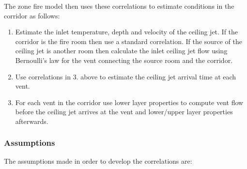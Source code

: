 The zone fire model then uses these correlations to estimate conditions in the corridor as follows:

\begin{enumerate}
\item Estimate the inlet temperature, depth and velocity of the ceiling jet. If the corridor is the fire room then use a standard correlation.  If the source of the ceiling jet is another room then calculate the inlet ceiling jet flow using Bernoulli's law for the vent connecting the source room and the corridor.

\item Use correlations in 3. above to estimate the ceiling jet arrival time at each vent.

\item For each vent in the corridor use lower layer properties to compute vent flow before the ceiling jet arrives at the vent and lower/upper layer properties afterwards.
\end{enumerate}


\subsubsection{Assumptions}

The assumptions made in order to develop the correlations are:

